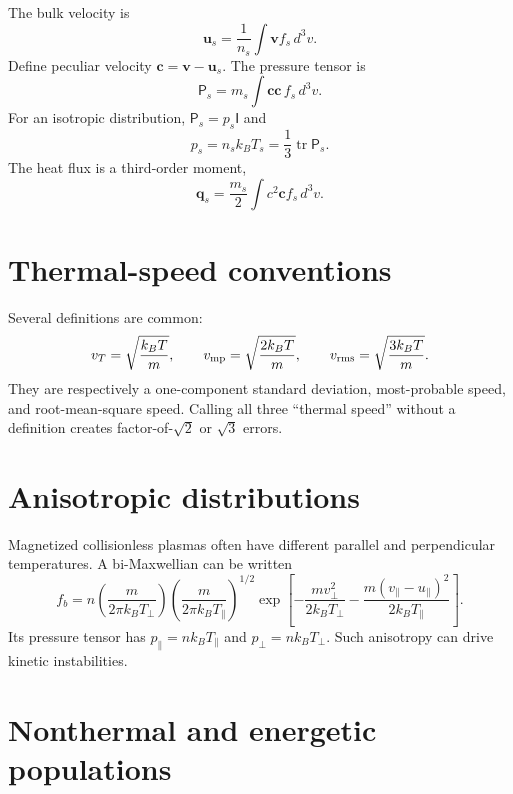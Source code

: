 \documentclass[11pt]{article}
\begin{document}
The bulk velocity is
\begin{equation}
\mathbf u_s=\frac{1}{n_s}\int\mathbf v f_s\,d^3v.
\end{equation}
Define peculiar velocity $\mathbf c=\mathbf v-\mathbf u_s$. The pressure tensor is
\begin{equation}
\mathsf P_s=m_s\int\mathbf c\mathbf c\,f_s\,d^3v.
\end{equation}
For an isotropic distribution, $\mathsf P_s=p_s\mathsf I$ and
\begin{equation}
p_s=n_sk_BT_s=\frac{1}{3}\operatorname{tr}\mathsf P_s.
\end{equation}
The heat flux is a third-order moment,
\begin{equation}
\mathbf q_s=\frac{m_s}{2}\int c^2\mathbf c f_s\,d^3v.
\end{equation}


\section{Thermal-speed conventions}

Several definitions are common:
\begin{equation}
v_T=\sqrt{\frac{k_BT}{m}},\qquad
v_{\rm mp}=\sqrt{\frac{2k_BT}{m}},\qquad
v_{\rm rms}=\sqrt{\frac{3k_BT}{m}}.
\end{equation}
They are respectively a one-component standard deviation, most-probable speed, and root-mean-square speed. Calling all three ``thermal speed'' without a definition creates factor-of-$\sqrt{2}$ or $\sqrt{3}$ errors.


\section{Anisotropic distributions}

Magnetized collisionless plasmas often have different parallel and perpendicular temperatures. A bi-Maxwellian can be written
\begin{equation}
f_b=
n\left(\frac{m}{2\pi k_BT_\perp}\right)
\left(\frac{m}{2\pi k_BT_\parallel}\right)^{1/2}
\exp\left[-\frac{mv_\perp^2}{2k_BT_\perp}
-\frac{m(v_\parallel-u_\parallel)^2}{2k_BT_\parallel}\right].
\end{equation}
Its pressure tensor has $p_\parallel=nk_BT_\parallel$ and $p_\perp=nk_BT_\perp$. Such anisotropy can drive kinetic instabilities.


\section{Nonthermal and energetic populations}
\end{document}

